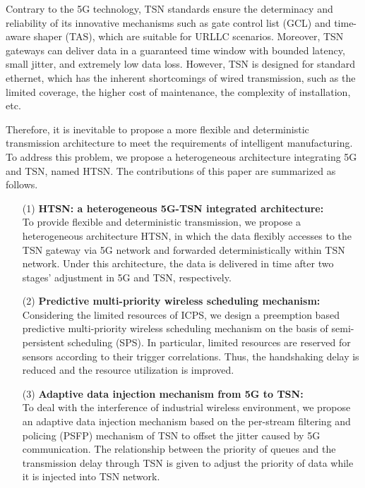 \documentclass{SCIS2021}
\begin{document}
	\par Contrary to the 5G technology, TSN standards ensure the determinacy and reliability of its innovative mechanisms such as gate control list (GCL) and time-aware shaper (TAS), which are suitable for {\color{black}URLLC} scenarios. Moreover, TSN gateways can deliver data in a guaranteed time window with bounded latency, small jitter, and extremely low data loss\cite{farkas20195g}. However, TSN is designed for standard ethernet, which has the inherent shortcomings of wired transmission, such as the limited coverage, the higher cost of maintenance, the complexity of installation, etc.
	
	\par Therefore, it is inevitable to propose a more flexible and deterministic transmission architecture to meet the requirements of intelligent manufacturing. {\color{black}To address this problem, we propose a heterogeneous architecture integrating 5G and TSN, named HTSN.} The contributions of this paper are summarized as follows.
	
	
	\begin{itemize}[itemsep=15pt,topsep=0pt]
		\item[(1)]
		\setlength{\itemsep}{15pt }
		\textbf{HTSN: {\color{black}a heterogeneous 5G-TSN integrated architecture}:}\\
		To provide flexible and deterministic transmission, we propose a heterogeneous architecture HTSN, in which the data flexibly accesses to the {\color{black}TSN gateway via 5G network and forwarded deterministically within TSN network}. Under this architecture, {\color{black}the data is delivered in time after two stages' adjustment in 5G and TSN, respectively.} 
	\end{itemize}
	
	\begin{itemize}[itemsep= 15pt,topsep =-0 pt]
		\item[(2)]
		\textbf{Predictive multi-priority wireless scheduling mechanism:}\\
		Considering the limited resources of {\color{black}ICPS}, we design a preemption based predictive multi-priority wireless scheduling mechanism on the basis of semi-persistent scheduling (SPS). {\color{black}In particular, limited resources are reserved for sensors according to their trigger correlations. Thus, the handshaking delay is reduced and the resource utilization is improved.}
	\end{itemize}
	
	\begin{itemize}[itemsep= 15pt,topsep = -0 pt]
		\item[(3)]
		\textbf{Adaptive data injection mechanism {\color{black}from 5G to TSN}:}\\
		{\color{black}To deal with the interference of industrial wireless environment, we propose an adaptive data injection mechanism based on the per-stream filtering and policing (PSFP) mechanism of TSN to offset the jitter caused by 5G communication. The relationship between the priority of queues and the transmission delay through TSN is given to adjust the priority of data while it is injected into TSN network.} 
	\end{itemize}
	
\end{document}

